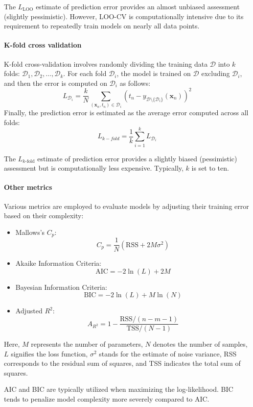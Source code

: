 The $L_{\text{LOO}}$ estimate of prediction error provides an almost unbiased assessment (slightly pessimistic). 
However, LOO-CV is computationally intensive due to its requirement to repeatedly train models on nearly all data points.

\paragraph*{K-fold cross validation}
K-fold cross-validation involves randomly dividing the training data $\mathcal{D}$ into $k$ folds: $\mathcal{D}_1,\mathcal{D}_2,\dots,\mathcal{D}_k$. 
For each fold $\mathcal{D}_i$, the model is trained on $\mathcal{D}$ excluding $\mathcal{D}_i$, and then the error is computed on $\mathcal{D}_i$ as follows:
\[L_{\mathcal{D}_i}=\dfrac{k}{N}\sum_{(\textbf{x}_n,t_n) \in \mathcal{D}_i} {\left( t_n-y_{\mathcal{D}\setminus\{\mathcal{D}_i\}}(\textbf{x}_n) \right)}^2\]
Finally, the prediction error is estimated as the average error computed across all folds:
\[L_{k-fold}=\dfrac{1}{k}\sum_{i=1}^{k}L_{\mathcal{D}_i}\]

The $L_{k\text{-fold}}$ estimate of prediction error provides a slightly biased (pessimistic) assessment but is computationally less expensive. 
Typically, $k$ is set to ten.

\paragraph*{Other metrics}
Various metrics are employed to evaluate models by adjusting their training error based on their complexity:
\begin{itemize}
    \item Mallows's $C_p$: 
        \[C_p=\dfrac{1}{N}\left( \text{RSS}+2M\sigma^2 \right)\]
    \item Akaike Information Criteria:
        \[\text{AIC}=-2\ln(L)+2M\]
    \item Bayesian Information Criteria: 
        \[\text{BIC}=-2\ln(L)+M\ln(N)\]
    \item Adjusted $R^2$:
        \[A_{R^2}=1-\dfrac{\text{RSS}/(n-m-1)}{\text{TSS}/(N-1)}\]
\end{itemize}
Here, $M$ represents the number of parameters, $N$ denotes the number of samples, $L$ signifies the loss function, $\sigma^2$ stands for the estimate of noise variance, RSS corresponds to the residual sum of squares, and TSS indicates the total sum of squares.

AIC and BIC are typically utilized when maximizing the log-likelihood. 
BIC tends to penalize model complexity more severely compared to AIC.\@
